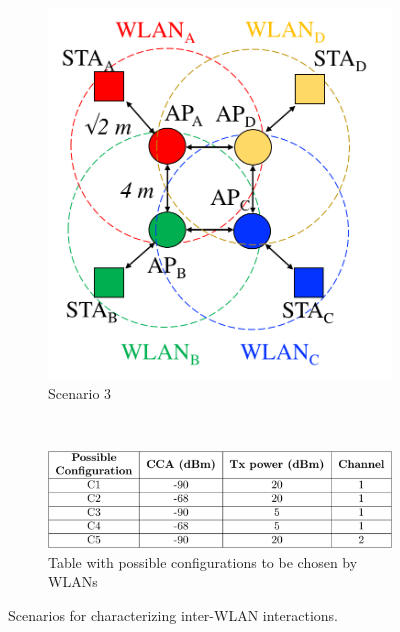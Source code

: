 \documentclass{article}
\begin{document}
\begin{figure}[t!]
\begin{minipage}[b]{0.3\textwidth}
\begin{subfigure}[b]{\linewidth}
			\centering	
			\includegraphics[width=\textwidth]{s3_interactions}
			\caption{Scenario 3}\label{fig:s3_interactions}
		\end{subfigure}\\[\baselineskip]
	\end{minipage}
	\begin{subfigure}[b]{0.6\linewidth}
		\centering	
		\includegraphics[width=\textwidth]{table_confs}
		\caption{Table with possible configurations to be chosen by WLANs}\label{tbl:configurations}
	\end{subfigure}		
	\caption{Scenarios for characterizing inter-WLAN interactions.}
	\label{fig:scenarios_validations}
\end{figure}	
\end{document}
